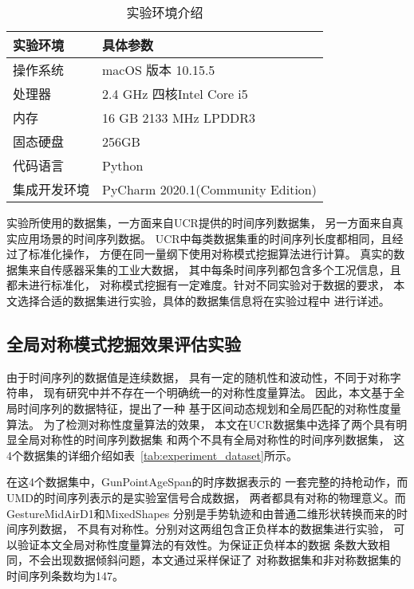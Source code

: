 \begin{table}
  \centering
  \caption{实验环境介绍}
  \begin{tabular}{ll}
    \toprule
    实验环境     & 具体参数                          \\
    \midrule
    操作系统     & macOS 版本 10.15.5                \\
    处理器       & 2.4 GHz 四核Intel Core i5         \\
    内存         & 16 GB 2133 MHz LPDDR3             \\
    固态硬盘     & 256GB                             \\
    代码语言     & Python                            \\
    集成开发环境 & PyCharm 2020.1(Community Edition) \\
    \bottomrule
  \end{tabular}
  \label{tab:experiment_enviroment}
\end{table}

实验所使用的数据集，一方面来自UCR提供的时间序列数据集，
另一方面来自真实应用场景的时间序列数据。
UCR中每类数据集重的时间序列长度都相同，且经过了标准化操作，
方便在同一量纲下使用对称模式挖掘算法进行计算。
真实的数据集来自传感器采集的工业大数据，
其中每条时间序列都包含多个工况信息，且都未进行标准化，
对称模式挖掘有一定难度。针对不同实验对于数据的要求，
本文选择合适的数据集进行实验，具体的数据集信息将在实验过程中
进行详述。

\subsection{全局对称模式挖掘效果评估实验}
由于时间序列的数据值是连续数据，
具有一定的随机性和波动性，不同于对称字符串，
现有研究中并不存在一个明确统一的对称性度量算法。
因此，本文基于全局时间序列的数据特征，提出了一种
基于区间动态规划和全局匹配的对称性度量算法。
为了检测对称性度量算法的效果，
本文在UCR数据集中选择了两个具有明显全局对称性的时间序列数据集
和两个不具有全局对称性的时间序列数据集，
这4个数据集的详细介绍如表~\ref{tab:experiment_dataset}所示。

在这4个数据集中，GunPointAgeSpan的时序数据表示的
一套完整的持枪动作，而UMD的时间序列表示的是实验室信号合成数据，
两者都具有对称的物理意义。而GestureMidAirD1和MixedShapes
分别是手势轨迹和由普通二维形状转换而来的时间序列数据，
不具有对称性。分别对这两组包含正负样本的数据集进行实验，
可以验证本文全局对称性度量算法的有效性。为保证正负样本的数据
条数大致相同，不会出现数据倾斜问题，本文通过采样保证了
对称数据集和非对称数据集的时间序列条数均为147。

